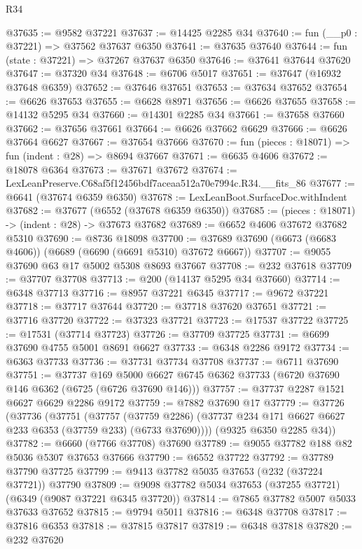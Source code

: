 \begin{lexlean}{R34}
\begin{coremodule}
@37635 := @9582 @37221
@37637 := @14425 @2285 @34
@37640 := fun (__p0 : @37221) => @37562 @37637 @6350
@37641 := @37635 @37640
@37644 := fun (state : @37221) => @37267 @37637 @6350
@37646 := @37641 @37644 @37620
@37647 := @37320 @34
@37648 := @6706 @5017
@37651 := @37647 (@16932 @37648 @6359)
@37652 := @37646 @37651
@37653 := @37634 @37652
@37654 := @6626 @37653
@37655 := @6628 @8971
@37656 := @6626 @37655
@37658 := @14132 @5295 @34
@37660 := @14301 @2285 @34
@37661 := @37658 @37660
@37662 := @37656 @37661
@37664 := @6626 @37662 @6629
@37666 := @6626 @37664 @6627
@37667 := @37654 @37666
@37670 := fun (pieces : @18071) => fun (indent : @28) => @8694 @37667
@37671 := @6635 @4606
@37672 := @18078 @6364
@37673 := @37671 @37672
@37674 := LexLeanPreserve.C68af5f12456bdf7aceaa512a70e7994c.R34.__fits_86
@37677 := @6641 (@37674 @6359 @6350)
@37678 := LexLeanBoot.SurfaceDoc.withIndent
@37682 := @37677 (@6552 (@37678 @6359 @6350))
@37685 := (pieces : @18071) -> (indent : @28) -> @37673 @37682
@37689 := @6652 @4606 @37672 @37682 @5310
@37690 := @8736 @18098
@37700 := @37689 @37690 (@6673 (@6683 @4606)) (@6689 (@6690 (@6691 @5310) @37672 @6667))
@37707 := @9055 @37690 @63 @17 @5002 @5308 @8693 @37667
@37708 := @232 @37618
@37709 := @37707 @37708
@37713 := @200 (@14137 @5295 @34 @37660)
@37714 := @6348 @37713
@37716 := @8957 @37221 @6345
@37717 := @9672 @37221
@37718 := @37717 @37644
@37720 := @37718 @37620 @37651
@37721 := @37716 @37720
@37722 := @37323 @37721
@37723 := @17537 @37722
@37725 := @17531 (@37714 @37723)
@37726 := @37709 @37725
@37731 := @6699 @37690 @4755 @5001 @8691 @6627
@37733 := @6348 @2286 @9172
@37734 := @6363 @37733
@37736 := @37731 @37734 @37708
@37737 := @6711 @37690
@37751 := @37737
    @169
    @5000
    @6627
    @6745
    @6362
    @37733
    (@6720 @37690 @146 @6362 (@6725 (@6726 @37690 @146)))
@37757 := @37737 @2287 @1521 @6627 @6629 @2286 @9172
@37759 := @7882 @37690 @17
@37779 := @37726
    (@37736
      (@37751
        (@37757
          (@37759 @2286)
          (@37737 @234 @171 @6627 @6627 @233 @6353 (@37759 @233) (@6733 @37690))))
      (@9325 @6350 @2285 @34))
@37782 := @6660 (@7766 @37708) @37690
@37789 := @9055 @37782 @188 @82 @5036 @5307 @37653 @37666
@37790 := @6552 @37722
@37792 := @37789 @37790 @37725
@37799 := @9413 @37782 @5035 @37653 (@232 (@37224 @37721)) @37790
@37809 := @9098 @37782 @5034 @37653 (@37255 @37721) (@6349 (@9087 @37221 @6345 @37720))
@37814 := @7865 @37782 @5007 @5033 @37633 @37652
@37815 := @9794 @5011
@37816 := @6348 @37708
@37817 := @37816 @6353
@37818 := @37815 @37817
@37819 := @6348 @37818
@37820 := @232 @37620

\end{coremodule}
\end{lexlean}
